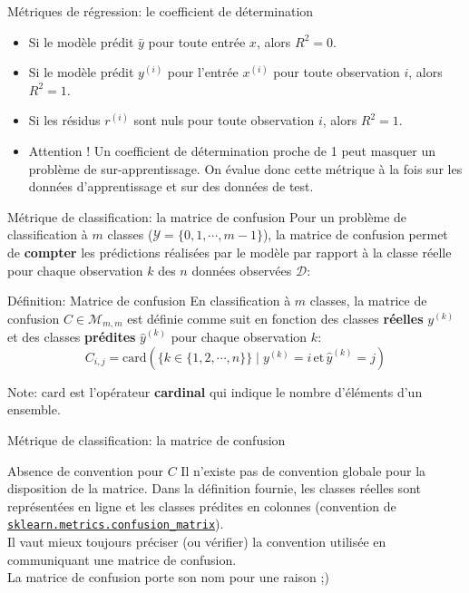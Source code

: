 \documentclass[10pt]{beamer}  %
\begin{document}
\begin{frame}{Métriques de régression: le coefficient de détermination}
	\begin{itemize}
		\item Si le modèle prédit $\bar{y}$ pour toute entrée $x$, alors $R^2 = 0$.
		\pause
		\item Si le modèle prédit $y^{(i)}$ pour l'entrée $x^{(i)}$ pour toute observation $i$, alors $R^2 = 1$.
		\pause
		\item Si les résidus $r^{(i)}$ sont nuls pour toute observation $i$, alors $R^2 = 1$.
		\pause
		\item Attention ! Un coefficient de détermination proche de 1 peut masquer un problème de sur-apprentissage. On évalue donc cette métrique à la fois sur les données d'apprentissage et sur des données de test.
	\end{itemize}
\end{frame}

\begin{frame}{Métrique de classification: la matrice de confusion}
	Pour un problème de classification à $m$ classes ($\mathcal{Y} = \{0, 1, \cdots, m-1\}$), la matrice de confusion permet de \textbf{compter} les prédictions réalisées par le modèle par rapport à la classe réelle pour chaque observation $k$ des $n$ données observées $\mathcal{D}$:
	\begin{block}{Définition: Matrice de confusion}
		En classification à $m$ classes, la matrice de confusion $C \in \mathcal{M}_{m,m}$ est définie comme suit en fonction des classes \textbf{réelles} $y^{(k)}$ et des classes \textbf{prédites} $\hat{y}^{(k)}$ pour chaque observation $k$:
		\begin{equation}
			C_{i,j} = \text{card} \left( \{k \in \{1, 2, \cdots, n\}\} \mid y^{(k)} = i \, \text{et} \, \hat{y}^{(k)} = j \right)
			\nonumber
		\end{equation}
	\end{block}
	\pause
	Note: $\text{card}$ est l'opérateur \textbf{cardinal} qui indique le nombre d'éléments d'un ensemble.
\end{frame}

\begin{frame}{Métrique de classification: la matrice de confusion}
	\begin{alertblock}{Absence de convention pour $C$}
		Il n'existe pas de convention globale pour la disposition de la matrice. Dans la définition fournie, les classes réelles sont représentées en ligne et les classes prédites en colonnes (convention de \href{https://scikit-learn.org/stable/modules/generated/sklearn.metrics.confusion_matrix.html}{\texttt{sklearn.metrics.confusion\_matrix}}). \\
		\vspace{0.5cm}
		Il vaut mieux toujours préciser (ou vérifier) la convention utilisée en communiquant une matrice de confusion. \\
		\vspace{0.5cm}
		La matrice de confusion porte son nom pour une raison ;)
	\end{alertblock}
\end{frame}
\end{document}
